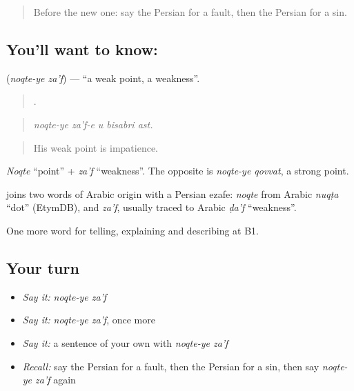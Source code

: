 \label{lesson:FA-C376-noqte-ye-zaf}



\begin{quote}
Before the new one: say the Persian for a fault, then the Persian for a sin.
\end{quote}

\subsection*{You'll want to know:  }
\textbf{ } (\emph{noqte-ye za'f}) — \textquotedblleft{}a weak point, a weakness\textquotedblright{}.

\begin{quote}
    .
\end{quote}

\begin{quote}
\emph{noqte-ye za'f-e u bisabri ast.}
\end{quote}

\begin{quote}
His weak point is impatience.
\end{quote}

\emph{Noqte} \textquotedblleft{}point\textquotedblright{} + \emph{za'f} \textquotedblleft{}weakness\textquotedblright{}. The opposite is \emph{noqte-ye qovvat}, a strong point.

\begin{cousinweb}
\textbf{ } joins two words of Arabic origin with a Persian ezafe: \emph{noqte} from Arabic \emph{nuqṭa} \textquotedblleft{}dot\textquotedblright{} (EtymDB), and \emph{za'f}, usually traced to Arabic \emph{ḍa'f} \textquotedblleft{}weakness\textquotedblright{}.
\end{cousinweb}

\begin{grammarlens}[title={What you've built}]
One more word for telling, explaining and describing at B1.
\end{grammarlens}

\subsection*{Your turn}
\begin{itemize}
\raggedright
  \item \emph{Say it:} \emph{noqte-ye za'f}
  \item \emph{Say it:} \emph{noqte-ye za'f}, once more
  \item \emph{Say it:} a sentence of your own with \emph{noqte-ye za'f}
  \item \emph{Recall:} say the Persian for a fault, then the Persian for a sin, then say \emph{noqte-ye za'f} again
\end{itemize}

